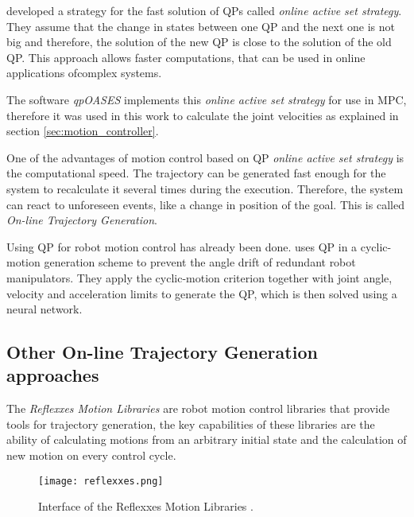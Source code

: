 \citet{qp_algorithm} developed a strategy for the fast solution of QPs called \textit{online active set strategy}. They assume that the change in states between one QP and the next one is not big and therefore, the solution of the new QP is close to the solution of the old QP. This approach allows faster computations, that can be used in online applications ofcomplex systems.
 
The software \textit{qpOASES} implements this \textit{online active set strategy} for use in MPC, therefore it was used in this work to calculate the joint velocities as explained in section \ref{sec:motion_controller}.

One of the advantages of motion control based on QP \textit{online active set strategy} is the computational speed. The trajectory can be generated fast enough for the system to recalculate it several times during the execution. Therefore, the system can react to unforeseen events, like a change in position of the goal. This is called \textit{On-line Trajectory Generation}.

Using QP for robot motion control has already been done. \cite{acc_level_control} uses QP in a cyclic-motion generation scheme to prevent the angle drift of redundant robot manipulators. They apply the cyclic-motion criterion together with joint angle, velocity and acceleration limits to generate the QP, which is then solved using a neural network.


\subsection{Other On-line Trajectory Generation approaches}

The \textit{Reflexxes Motion Libraries} \citep{reflexxes_lib} are robot motion control libraries that provide tools for trajectory generation, the key capabilities of these libraries are the ability of calculating motions from an arbitrary initial state and the calculation of new motion on every control cycle.

\begin{figure}[H]
	\centering
	\texttt{[image: reflexxes.png]}
	\vspace{-10pt}
	\caption[Reflexxes]{Interface of the Reflexxes Motion Libraries \citep[page 1]{reflexxes_lib}.}
	\vspace{-15pt}
	\label{fig:reflex}
\end{figure}

